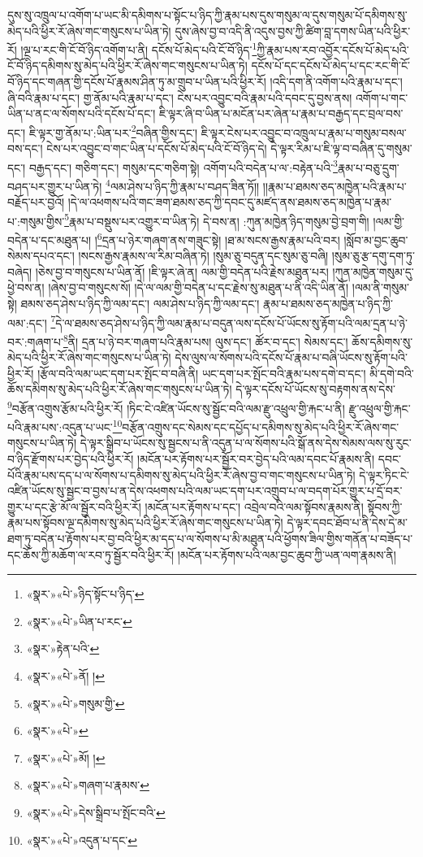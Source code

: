 དུས་སུ་འཁྲུལ་པ་འགོག་པ་ཡང་མི་དམིགས་པ་སྟོང་པ་ཉིད་ཀྱི་རྣམ་པས་དུས་གསུམ་ལ་དུས་གསུམ་པོ་དམིགས་སུ་མེད་པའི་ཕྱིར་རོ་ཞེས་གང་གསུངས་པ་ཡིན་ཏེ། དུས་ཞེས་བྱ་བ་འདི་ནི་འདུས་བྱས་ཀྱི་ཚིག་བླ་དགས་ཡིན་པའི་ཕྱིར་རོ། །ལྔ་པ་རང་གི་ངོ་བོ་ཉིད་འགོག་པ་ནི། དངོས་པོ་མེད་པའི་ངོ་བོ་ཉིད་\footnote{«སྣར་»«པེ་»ཉིད་སྟོང་པ་ཉིད་}ཀྱི་རྣམ་པས་རབ་འབྱོར་དངོས་པོ་མེད་པའི་ངོ་བོ་ཉིད་དམིགས་སུ་མེད་པའི་ཕྱིར་རོ་ཞེས་གང་གསུངས་པ་ཡིན་ཏེ། དངོས་པོ་དང་དངོས་པོ་མེད་པ་དང་རང་གི་ངོ་བོ་ཉིད་དང་གཞན་གྱི་དངོས་པོ་རྣམས་ཤིན་ཏུ་མ་གྲུབ་པ་ཡིན་པའི་ཕྱིར་རོ། །འདི་དག་ནི་འགོག་པའི་རྣམ་པ་དང་། ཞི་བའི་རྣམ་པ་དང་། གྱ་ནོམ་པའི་རྣམ་པ་དང་། ངེས་པར་འབྱུང་བའི་རྣམ་པའི་དབང་དུ་བྱས་ནས། འགོག་པ་གང་ཡིན་པ་ནང་ལ་སོགས་པའི་དངོས་པོ་དང་། ཇི་ལྟར་ཞི་བ་ཡིན་པ་མངོན་པར་ཞེན་པ་རྣམ་པ་བརྒྱད་དང་བྲལ་བས་དང་། ཇི་ལྟར་གྱ་ནོམ་པ་:ཡིན་པར་\footnote{«སྣར་»«པེ་»ཡིན་པ་རང་}བཞིན་གྱིས་དང་། ཇི་ལྟར་ངེས་པར་འབྱུང་བ་འཁྲུལ་པ་རྣམ་པ་གསུམ་བསལ་བས་དང་། ངེས་པར་འབྱུང་བ་གང་ཡིན་པ་དངོས་པོ་མེད་པའི་ངོ་བོ་ཉིད་དེ། དེ་ལྟར་རིམ་པ་ཇི་ལྟ་བ་བཞིན་དུ་གསུམ་དང་། བརྒྱད་དང་། གཅིག་དང་། གསུམ་དང་གཅིག་སྟེ། འགོག་པའི་བདེན་པ་ལ་:བརྟེན་པའི་\footnote{«སྣར་»རྟེན་པའི་}རྣམ་པ་བཅུ་དྲུག་བཤད་པར་གྱུར་པ་ཡིན་ཏེ། \footnote{«སྣར་»«པེ་»ནོ། ། }ལམ་ཤེས་པ་ཉིད་ཀྱི་རྣམ་པ་བཤད་ཟིན་ཏོ།། །།རྣམ་པ་ཐམས་ཅད་མཁྱེན་པའི་རྣམ་པ་བརྗོད་པར་བྱའོ། །དེ་ལ་འཕགས་པའི་གང་ཟག་ཐམས་ཅད་ཀྱི་དབང་དུ་མཛད་ནས་ཐམས་ཅད་མཁྱེན་པ་རྣམ་པ་:གསུམ་གྱིས་\footnote{«སྣར་»«པེ་»གསུམ་གྱི་}རྣམ་པ་བསྡུས་པར་འགྱུར་བ་ཡིན་ཏེ། དེ་བས་ན། :ཀུན་མཁྱེན་ཉིད་གསུམ་བྱེ་བྲག་གི། །ལམ་གྱི་བདེན་པ་དང་མཐུན་པ། །\footnote{«སྣར་»«པེ་»}དྲན་པ་ཉེར་གཞག་ནས་གཟུང་སྟེ། །ཐ་མ་སངས་རྒྱས་རྣམ་པའི་བར། །སློབ་མ་བྱང་ཆུབ་སེམས་དཔའ་དང་། །སངས་རྒྱས་རྣམས་ལ་རིམ་བཞིན་ཏེ། །སུམ་ཅུ་བདུན་དང་སུམ་ཅུ་བཞི། །སུམ་ཅུ་རྩ་དགུ་དག་ཏུ་བཞེད། །ཅེས་བྱ་བ་གསུངས་པ་ཡིན་ནོ། །ཇི་ལྟར་ཞེ་ན། ལམ་གྱི་བདེན་པའི་རྗེས་མཐུན་པར། །ཀུན་མཁྱེན་གསུམ་དུ་ཕྱེ་བས་ན། །ཞེས་བྱ་བ་གསུངས་སོ། །དེ་ལ་ལམ་གྱི་བདེན་པ་དང་རྗེས་སུ་མཐུན་པ་ནི་འདི་ཡིན་ནོ། །ལམ་ནི་གསུམ་སྟེ། ཐམས་ཅད་ཤེས་པ་ཉིད་ཀྱི་ལམ་དང་། ལམ་ཤེས་པ་ཉིད་ཀྱི་ལམ་དང་། རྣམ་པ་ཐམས་ཅད་མཁྱེན་པ་ཉིད་ཀྱི་ལམ་:དང་། \footnote{«སྣར་»«པེ་»མོ། ། }དེ་ལ་ཐམས་ཅད་ཤེས་པ་ཉིད་ཀྱི་ལམ་རྣམ་པ་བདུན་ལས་དངོས་པོ་ཡོངས་སུ་རྟོག་པའི་ལམ་དྲན་པ་ཉེ་བར་:གཞག་པ་\footnote{«སྣར་»«པེ་»གཞག་པ་རྣམས་}ནི། དྲན་པ་ཉེ་བར་གཞག་པའི་རྣམ་པས། ལུས་དང་། ཚོར་བ་དང་། སེམས་དང་། ཆོས་དམིགས་སུ་མེད་པའི་ཕྱིར་རོ་ཞེས་གང་གསུངས་པ་ཡིན་ཏེ། དེས་ལུས་ལ་སོགས་པའི་དངོས་པོ་རྣམ་པ་བཞི་ཡོངས་སུ་རྟོག་པའི་ཕྱིར་རོ། །རྩོལ་བའི་ལམ་ཡང་དག་པར་སྤོང་བ་བཞི་ནི། ཡང་དག་པར་སྤོང་བའི་རྣམ་པས་དགེ་བ་དང་། མི་དགེ་བའི་ཆོས་དམིགས་སུ་མེད་པའི་ཕྱིར་རོ་ཞེས་གང་གསུངས་པ་ཡིན་ཏེ། དེ་ལྟར་དངོས་པོ་ཡོངས་སུ་བརྟགས་ནས་དེས་\footnote{«སྣར་»«པེ་»དེས་སྒྲིབ་པ་སྤོང་བའི་}བརྩོན་འགྲུས་རྩོམ་པའི་ཕྱིར་རོ། །ཏིང་ངེ་འཛིན་ཡོངས་སུ་སྦྱོང་བའི་ལམ་རྫུ་འཕྲུལ་གྱི་རྐང་པ་ནི། རྫུ་འཕྲུལ་གྱི་རྐང་པའི་རྣམ་པས་:འདུན་པ་ཡང་\footnote{«སྣར་»«པེ་»འདུན་པ་དང་}བརྩོན་འགྲུས་དང་སེམས་དང་དཔྱོད་པ་དམིགས་སུ་མེད་པའི་ཕྱིར་རོ་ཞེས་གང་གསུངས་པ་ཡིན་ཏེ། དེ་ལྟར་སྒྲིབ་པ་ཡོངས་སུ་སྦྱངས་པ་ནི་འདུན་པ་ལ་སོགས་པའི་སྒོ་ནས་དེས་སེམས་ལས་སུ་རུང་བ་ཉིད་རྫོགས་པར་བྱེད་པའི་ཕྱིར་རོ། །མངོན་པར་རྟོགས་པར་སྦྱོར་བར་བྱེད་པའི་ལམ་དབང་པོ་རྣམས་ནི། དབང་པོའི་རྣམ་པས་དད་པ་ལ་སོགས་པ་དམིགས་སུ་མེད་པའི་ཕྱིར་རོ་ཞེས་བྱ་བ་གང་གསུངས་པ་ཡིན་ཏེ། དེ་ལྟར་ཏིང་ངེ་འཛིན་ཡོངས་སུ་སྦྱང་བ་བྱས་པ་ན་དེས་འཕགས་པའི་ལམ་ཡང་དག་པར་འགྲུབ་པ་ལ་བདག་པོར་གྱུར་པ་དྲོ་བར་གྱུར་པ་དང་རྩེ་མོ་ལ་སྦྱོར་བའི་ཕྱིར་རོ། །མངོན་པར་རྟོགས་པ་དང་། འབྲེལ་བའི་ལམ་སྟོབས་རྣམས་ནི། སྟོབས་ཀྱི་རྣམ་པས་སྟོབས་ལྔ་དམིགས་སུ་མེད་པའི་ཕྱིར་རོ་ཞེས་གང་གསུངས་པ་ཡིན་ཏེ། དེ་ལྟར་དབང་ཐོབ་པ་ནི་དེས་དེ་མ་ཐག་ཏུ་བདེན་པ་རྟོགས་པར་བྱ་བའི་ཕྱིར་མ་དད་པ་ལ་སོགས་པ་མི་མཐུན་པའི་ཕྱོགས་ཟིལ་གྱིས་གནོན་པ་བཟོད་པ་དང་ཆོས་ཀྱི་མཆོག་ལ་རབ་ཏུ་སྦྱོར་བའི་ཕྱིར་རོ། །མངོན་པར་རྟོགས་པའི་ལམ་བྱང་ཆུབ་ཀྱི་ཡན་ལག་རྣམས་ནི། 